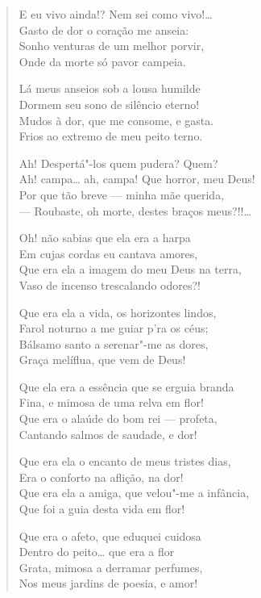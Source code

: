 \begin{verse}
E eu vivo ainda!? Nem sei como vivo!\ldots{}\\
Gasto de dor o coração me anseia:\\
Sonho venturas de um melhor porvir,\\
Onde da morte só pavor campeia.

Lá meus anseios sob a lousa humilde\\
Dormem seu sono de silêncio eterno!\\
Mudos à dor, que me consome, e gasta.\\
Frios ao extremo de meu peito terno.

Ah! Despertá"-los quem pudera? Quem?\\
Ah! campa\ldots{} ah, campa! Que horror, meu Deus!\\
Por que tão breve --- minha mãe querida,\\
--- Roubaste, oh morte, destes braços meus?!!\ldots{}

Oh! não sabias que ela era a harpa\\
Em cujas cordas eu cantava amores,\\
Que era ela a imagem do meu Deus na terra,\\
Vaso de incenso trescalando odores?!

Que era ela a vida, os horizontes lindos,\\
Farol noturno a me guiar p'ra os céus;\\
Bálsamo santo a serenar"-me as dores,\\
Graça melíflua, que vem de Deus!

Que ela era a essência que se erguia branda\\
Fina, e mimosa de uma relva em flor!\\
Que era o alaúde do bom rei --- profeta,\\
Cantando salmos de saudade, e dor!

Que era ela o encanto de meus tristes dias,\\
Era o conforto na aflição, na dor!\\
Que era ela a amiga, que velou"-me a infância,\\
Que foi a guia desta vida em flor!

Que era o afeto, que eduquei cuidosa\\
Dentro do peito\ldots{} que era a flor\\
Grata, mimosa a derramar perfumes,\\
Nos meus jardins de poesia, e amor!


\end{verse}
